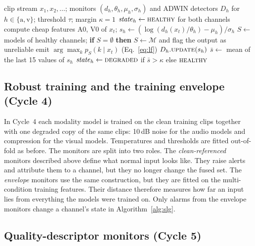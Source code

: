 \begin{algorithm}[t]
\caption{Stream-level gating (Cycle 3)}\label{alg:slg}
\begin{algorithmic}[1]
\Require clip stream $x_1,x_2,\dots$; monitors $(d_h,\theta_h,\mu_h,\sigma_h)$ and ADWIN detectors $D_h$ for $h\in\{\mathrm{a},\mathrm{v}\}$; threshold $\tau$; margin $\kappa=1$
\State $\mathit{state}_h\gets\textsc{healthy}$ for both channels
  \State compute cheap features A0, V0 of $x_t$; $s_h\gets(\log(d_h(x_t)/\theta_h)-\mu_h)/\sigma_h$
  \State $S\gets$ models of healthy channels; \textbf{if} $S=\emptyset$ \textbf{then} $S\gets\mathcal{M}$ and flag the output as unreliable
  \State emit $\arg\max_k p_S(k\mid x_t)$ (Eq.~\ref{eq:lf})
    \State $D_h.\textsc{update}(s_h)$
       \State $\bar{s}\gets$ mean of the last 15 values of $s_h$
       \State $\mathit{state}_h\gets\textsc{degraded}$ if $\bar{s}>\kappa$ else $\textsc{healthy}$ 
    \EndIf
  \EndFor
\EndFor
\end{algorithmic}
\end{algorithm}

\subsection{Robust training and the training envelope (Cycle 4)}\label{sec:envelope}

In Cycle~4 each modality model is trained on the clean training clips together with one degraded copy of the same clips: 10\,dB noise for the audio models and compression for the visual models. Temperatures and thresholds are fitted out-of-fold as before. The monitors are split into two roles. The \emph{clean-referenced} monitors described above define what normal input looks like. They raise alerts and attribute them to a channel, but they no longer change the fused set. The \emph{envelope} monitors use the same construction, but they are fitted on the multi-condition training features. Their distance therefore measures how far an input lies from everything the models were trained on. Only alarms from the envelope monitors change a channel's state in Algorithm~\ref{alg:slg}.

\subsection{Quality-descriptor monitors (Cycle 5)}\label{sec:qd}


